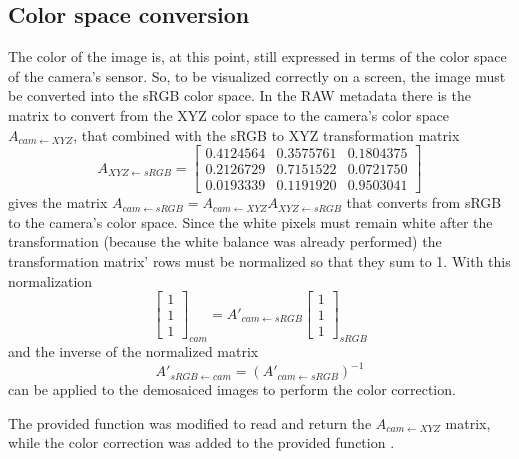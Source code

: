 \documentclass[a4paper,oneside]{article}
\begin{document}
\subsection{Color space conversion}
The color of the image is, at this point, still expressed in terms of
the color space of the camera's sensor. So, to be visualized correctly
on a screen, the image must be converted into the sRGB color space.
%
In the RAW metadata there is the matrix to convert from the XYZ color
space to the camera's color space $A_{cam \leftarrow XYZ}$, that
combined with the sRGB to XYZ transformation matrix
\begin{equation*}
  A_{XYZ \leftarrow sRGB} = \left[ \begin{array}{ccc}
      0.4124564 & 0.3575761 & 0.1804375 \\
      0.2126729 & 0.7151522 & 0.0721750 \\
      0.0193339 & 0.1191920 & 0.9503041
    \end{array} \right]
\end{equation*}
gives the matrix $A_{cam \leftarrow sRGB} = A_{cam \leftarrow XYZ}
A_{XYZ \leftarrow sRGB}$ that converts from sRGB to the camera's color
space.
%
Since the white pixels must remain white after the transformation
(because the white balance was already performed) the transformation
matrix' rows must be normalized so that they sum to 1. With this
normalization
\begin{equation*}
  \left[ \begin{array}{c} 1 \\ 1 \\ 1 \end{array} \right]_{cam} =
  A'_{cam \leftarrow sRGB}
  \left[ \begin{array}{c} 1 \\ 1 \\ 1 \end{array} \right]_{sRGB}
\end{equation*}
and the inverse of the normalized matrix
\begin{equation*}
  A'_{sRGB \leftarrow cam}  = \left( A'_{cam \leftarrow sRGB} \right)^{-1}
\end{equation*}
can be applied to the demosaiced images to perform the color
correction.

The provided function  was modified to read and
return the $A_{cam \leftarrow XYZ}$ matrix, while the color correction
was added to the provided function .
\end{document}

